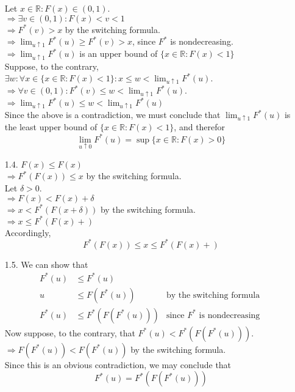 \documentclass[11pt]{article}
\newcommand{\R}{\mathbb{R}}
\theoremstyle{definition}
\begin{document}
\begin{itemize}
        Let \(x\in\R: F(x)\in(0,1)\). \\
        \(\Rightarrow \exists v\in(0,1): F(x)<v<1 \) \\
        \(\Rightarrow F^*(v)>x \) by the switching formula. \\
        \(\Rightarrow \lim_{u\uparrow 1} F^*(u) \geq F^*(v) > x\), since \(F^*\) is nondecreasing.\\
        \(\Rightarrow \lim_{u\uparrow 1} F^*(u)\) is an upper bound of \(\{x\in\R:F(x)<1\}\) \\
        Suppose, to the contrary, \(\exists w: \forall x \in \{x\in\R: F(x)<1\}: x\leq w < \lim_{u\uparrow 1} F^*(u)\). \\
        \(\Rightarrow \forall v\in(0,1): F^*(v)\leq w < \lim_{u\uparrow 1} F^*(u)\). \\
        \(\Rightarrow \lim_{u\uparrow 1} F^*(u) \leq w < \lim_{u\uparrow 1} F^*(u)\) \\
        Since the above is a contradiction, we must conclude that \(\lim_{u\uparrow 1} F^*(u)\) is the least upper bound of \(\{x\in\R:F(x)<1\}\), and therefor \\
        \[\lim_{u\uparrow 0} F^*(u) = \sup\{x\in \R: F(x)>0\}\]
    \item[1.4.]
        \(F(x)\leq F(x)\) \\
        \(\Rightarrow F^*(F(x))\leq x \) by the switching formula. \\
        Let \(\delta>0\). \\
        \(\Rightarrow F(x) < F(x) + \delta \) \\
        \(\Rightarrow x < F^*(F(x+\delta)) \) by the switching formula. \\
        \(\Rightarrow x \leq F^*(F(x)+) \) \\
        Accordingly,
        \[F^*(F(x))\leq x \leq F^*(F(x)+) \]
    \item[1.5.]
        We can show that
        \begin{align*}
            F^*(u) &\leq F^*(u)         & \\
                u  &\leq F(F^*(u))      & \mbox{by the switching formula }  \\
            F^*(u) &\leq F^*(F(F^*(u))) & \mbox{since } F^* \mbox{ is nondecreasing}             
        \end{align*}    
        Now suppose, to the contrary, that \(F^*(u)<F^*(F(F^*(u)))\). \\
        \(\Rightarrow F(F^*(u))<F(F^*(u)) \) by the switching formula. \\
        Since this is an obvious contradiction, we may conclude that
        \[F^*(u) = F^*(F(F^*(u))) \]
        \smallskip


\end{itemize}
\end{document}
